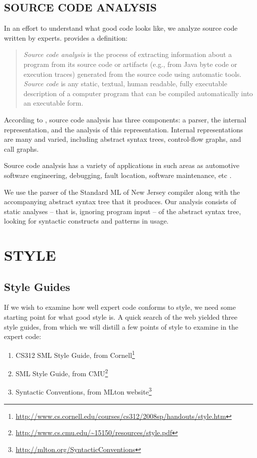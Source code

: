 \documentclass[12pt,abstracton]{scrartcl}
\begin{document}
\subsection{SOURCE CODE ANALYSIS}
In an effort to understand what good code looks like, we analyze source code
written by experts. \cite{Bin07} provides a definition:
\begin{quote}
\emph{Source code analysis} is the process of extracting
information about a program from its source code
or artifacts (e.g., from Java byte code or execution
traces) generated from the source code using automatic tools.
\emph{Source code} is any static, textual,
human readable, fully executable description of
a computer program that can be compiled automatically into an executable form.
\end{quote}

According to \cite{Bin07}, source code analysis has three components: a parser,
the internal representation, and the analysis of this representation.
Internal representations are many and varied, including abstract syntax trees,
control-flow graphs, and call graphs.

Source code analysis has a variety of applications in such areas as
automotive software engineering, debugging, fault location, software maintenance,
etc \cite{Bin07}.

We use the parser of the Standard ML of New Jersey compiler along with the accompanying
abstract syntax tree that it produces. Our analysis
consists of static analyses -- that is, ignoring program input -- of the abstract syntax tree, looking for
syntactic constructs and patterns in usage.
\section{STYLE}\label{sec:style}
\subsection{Style Guides}\label{subsec:guide}
If we wish to examine how well expert code conforms to style, we need some starting point for
what good style is. A quick search of the web yielded three style guides, from which
we will distill a few points of style to examine in the expert code:
\begin{enumerate}
\item CS312 SML Style Guide, from Cornell\footnote{\url{http://www.cs.cornell.edu/courses/cs312/2008sp/handouts/style.htm}}
\item SML Style Guide, from CMU\footnote{\url{http://www.cs.cmu.edu/~15150/resources/style.pdf}}
\item Syntactic Conventions, from MLton website\footnote{\url{http://mlton.org/SyntacticConventions}}
\end{enumerate}
\end{document}

